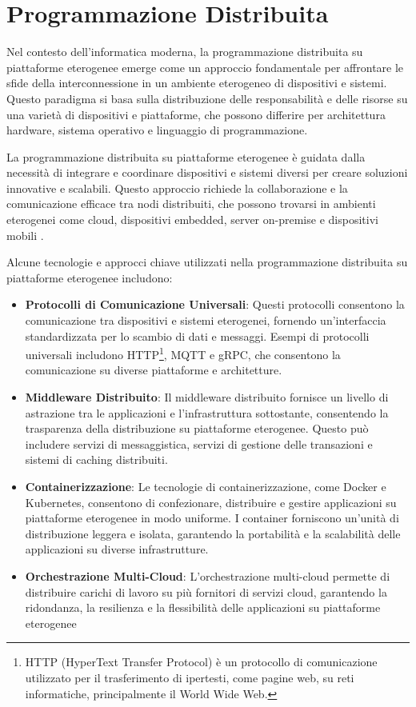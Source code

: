 \documentclass[12pt,a4paper,openright,twoside]{book}
\begin{document}
\section{Programmazione Distribuita}

Nel contesto dell'informatica moderna, la programmazione distribuita su piattaforme eterogenee emerge come un approccio fondamentale per affrontare le sfide
 della interconnessione in un ambiente eterogeneo di dispositivi e sistemi. Questo paradigma si basa sulla distribuzione delle responsabilità e delle risorse
 su una varietà di dispositivi e piattaforme, che possono differire per architettura hardware, sistema operativo e linguaggio di programmazione.

La programmazione distribuita su piattaforme eterogenee è guidata dalla necessità di integrare e coordinare dispositivi e sistemi diversi per creare soluzioni
 innovative e scalabili. Questo approccio richiede la collaborazione e la comunicazione efficace tra nodi distribuiti, che possono trovarsi in ambienti eterogenei
 come cloud, dispositivi embedded, server on-premise e dispositivi mobili \cite{DBLP:books/el/leeuwen90/LamportL90}.

Alcune tecnologie e approcci chiave utilizzati nella programmazione distribuita su piattaforme eterogenee includono:

\begin{itemize}
\item \textbf{Protocolli di Comunicazione Universali}: Questi protocolli consentono la comunicazione tra dispositivi e sistemi eterogenei,
 fornendo un'interfaccia standardizzata per lo scambio di dati e messaggi. Esempi di protocolli universali includono HTTP\footnote{
    HTTP (HyperText Transfer Protocol) è un protocollo di comunicazione utilizzato per il trasferimento di ipertesti, 
    come pagine web, su reti informatiche, principalmente il World Wide Web.
 }, \ac{MQTT} e gRPC, che consentono la comunicazione su diverse piattaforme e architetture.
\item \textbf{Middleware Distribuito}: Il middleware distribuito fornisce un livello di astrazione tra le applicazioni e l'infrastruttura sottostante,
  consentendo la trasparenza della distribuzione su piattaforme eterogenee. Questo può includere servizi di messaggistica, servizi di gestione delle transazioni
  e sistemi di caching distribuiti.
\item \textbf{Containerizzazione}: Le tecnologie di containerizzazione, come Docker e Kubernetes, consentono di confezionare,
  distribuire e gestire applicazioni su piattaforme eterogenee in modo uniforme. I container forniscono un'unità di distribuzione leggera e isolata,
  garantendo la portabilità e la scalabilità delle applicazioni su diverse infrastrutture.
\item \textbf{Orchestrazione Multi-Cloud}: L'orchestrazione multi-cloud permette di distribuire carichi di lavoro su più fornitori di servizi cloud,
 garantendo la ridondanza, la resilienza e la flessibilità delle applicazioni su piattaforme eterogenee
\end{itemize}
\end{document}
